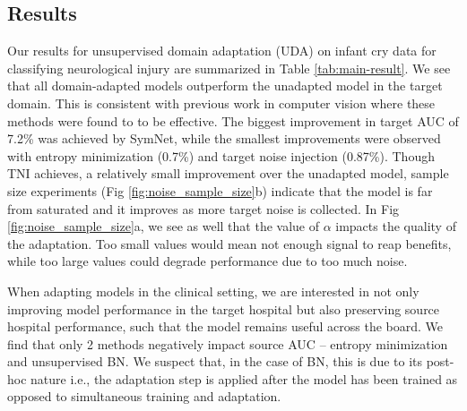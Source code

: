 \documentclass{article}
\begin{document}
\subsection{Results}
Our results for unsupervised domain adaptation (UDA) on infant cry data for classifying neurological injury are summarized in Table \ref{tab:main-result}. We see that all domain-adapted models outperform the unadapted model in the target domain. This is consistent with previous work in computer vision where these methods were found to to be effective. The biggest improvement in target AUC of 7.2\% was achieved by SymNet, while the smallest improvements were observed with entropy minimization (0.7\%) and target noise injection (0.87\%). Though TNI achieves, a relatively small improvement over the unadapted model, sample size experiments (Fig \ref{fig:noise_sample_size}b) indicate that the model is far from saturated and it improves as more target noise is collected. In Fig \ref{fig:noise_sample_size}a, we see as well that the value of $\alpha$ impacts the quality of the adaptation. Too small values would mean not enough signal to reap benefits, while too large values could degrade performance due to too much noise.

When adapting models in the clinical setting, we are interested in not only improving model performance in the target hospital but also preserving source hospital performance, such that the model remains useful across the board. We find that only 2 methods negatively impact source AUC -- entropy minimization and unsupervised BN. We suspect that, in the case of BN, this is due to its post-hoc nature i.e., the adaptation step is applied after the model has been trained as opposed to simultaneous training and adaptation.



\end{document}
